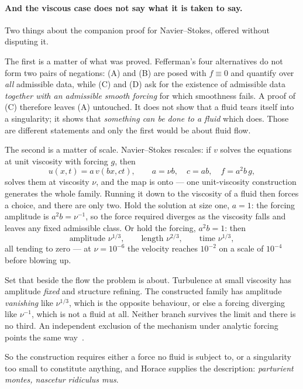 \documentclass[11pt]{article}
\begin{document}
\paragraph{And the viscous case does not say what it is taken to say.} Two things about the
companion proof for Navier--Stokes, offered without disputing it.

The first is a matter of what was proved. Fefferman's four alternatives do not form two pairs of
negations: (A) and (B) are posed with $f\equiv0$ and quantify over \emph{all} admissible data, while
(C) and (D) ask for the existence of admissible data \emph{together with an admissible smooth
forcing} for which smoothness fails. A proof of (C) therefore leaves (A) untouched. It does not show
that a fluid tears itself into a singularity; it shows that \emph{something can be done to a fluid}
which does. Those are different statements and only the first would be about fluid flow.

The second is a matter of scale. Navier--Stokes rescales: if $v$ solves the equations at unit
viscosity with forcing $g$, then
\begin{equation}\label{eq:rescale}
u(x,t)=a\,v(bx,ct),\qquad a=\nu b,\quad c=ab,\quad f=a^2b\,g,
\end{equation}
solves them at viscosity $\nu$, and the map is onto --- one unit-viscosity construction generates the
whole family. Running it down to the viscosity of a fluid then forces a choice, and there are only
two. Hold the solution at size one, $a=1$: the forcing amplitude is $a^2b=\nu^{-1}$, so the force
required diverges as the viscosity falls and leaves any fixed admissible class. Or hold the forcing,
$a^2b=1$: then
\[
\text{amplitude } \nu^{1/3},\qquad \text{length } \nu^{2/3},\qquad \text{time } \nu^{1/3},
\]
all tending to zero --- at $\nu=10^{-6}$ the velocity reaches $10^{-2}$ on a scale of $10^{-4}$
before blowing up.

Set that beside the flow the problem is about. Turbulence at small viscosity has amplitude
\emph{fixed} and structure refining. The constructed family has amplitude \emph{vanishing} like
$\nu^{1/3}$, which is the opposite behaviour, or else a forcing diverging like $\nu^{-1}$, which is
not a fluid at all. Neither branch survives the limit and there is no third. An independent exclusion
of the mechanism under analytic forcing points the same way~\cite{civ}.

So the construction requires either a force no fluid is subject to, or a singularity too small to
constitute anything, and Horace supplies the description: \emph{parturient montes, nascetur
ridiculus mus}.
\end{document}
